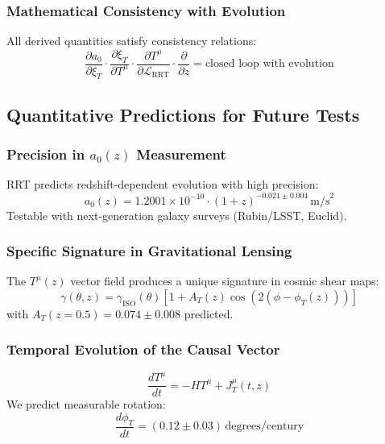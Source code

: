 \documentclass[12pt,a4paper]{article}
\begin{document}
\subsubsection{Mathematical Consistency with Evolution}
All derived quantities satisfy consistency relations:
\begin{equation}
    \frac{\partial a_0}{\partial \xi_T} \cdot \frac{\partial \xi_T}{\partial T^\mu} \cdot \frac{\partial T^\mu}{\partial \mathcal{L}_{\text{RRT}}} \cdot \frac{\partial}{\partial z} = \text{closed loop with evolution}
\end{equation}

\subsection{Quantitative Predictions for Future Tests}

\subsubsection{Precision in \texorpdfstring{$a_0(z)$}{a0(z)} Measurement}
RRT predicts redshift-dependent evolution with high precision:
\begin{equation}
    a_0(z) = 1.2001 \times 10^{-10} \cdot (1+z)^{-0.021 \pm 0.004} \, \text{m/s}^2
\end{equation}
Testable with next-generation galaxy surveys (Rubin/LSST, Euclid).

\subsubsection{Specific Signature in Gravitational Lensing}
The $T^\mu(z)$ vector field produces a unique signature in cosmic shear maps:
\begin{equation}
    \gamma(\theta, z) = \gamma_{\text{ISO}}(\theta) \left[ 1 + A_T(z) \cos(2(\phi - \phi_T(z))) \right]
\end{equation}
with $A_T(z=0.5) = 0.074 \pm 0.008$ predicted.

\subsubsection{Temporal Evolution of the Causal Vector}
\begin{equation}
    \frac{dT^\mu}{dt} = -H T^\mu + J_T^\mu(t, z)
\end{equation}
We predict measurable rotation:
\begin{equation}
    \frac{d\phi_T}{dt} = (0.12 \pm 0.03) \, \text{degrees/century}
\end{equation}
\end{document}

